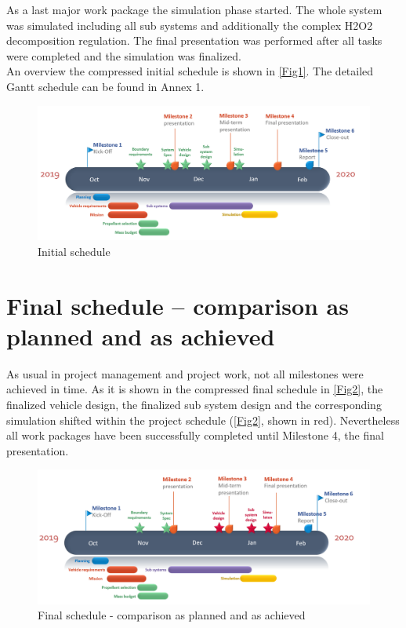 As a last major work package the simulation phase started. The whole system was simulated including all sub systems and additionally the complex H2O2 decomposition regulation. The final presentation was performed after all tasks were completed and the simulation was finalized.\\

An overview the compressed initial schedule is shown in \autoref{Fig1}. The detailed Gantt schedule can be found in Annex 1.

\begin{figure}[H]
	\centering\includegraphics[width=\linewidth]{initialschedule}
	\caption{Initial schedule}\label{Fig1}
\end{figure}
\clearpage
\section{Final schedule – comparison as planned and as achieved}

\qquad As usual in project management and project work, not all milestones were achieved in time. As it is shown in the compressed final schedule in \autoref{Fig2}, the finalized vehicle design, the finalized sub system design and the corresponding simulation shifted within the project schedule (\autoref{Fig2}, shown in red). Nevertheless all work packages have been successfully completed until Milestone 4, the final presentation.

\begin{figure}[H]
	\centering\includegraphics[width=\linewidth]{finalschedule}
	\caption{Final schedule - comparison as planned and as achieved}\label{Fig2}
\end{figure}


